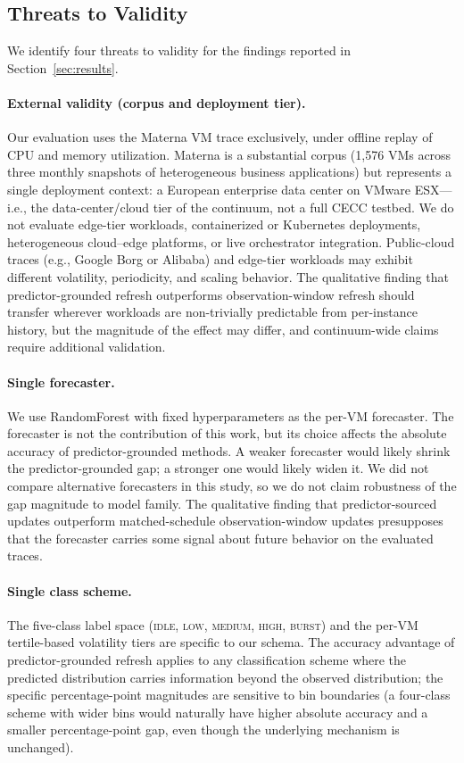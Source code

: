 \documentclass[manuscript,screen,review,anonymous]{acmart}
\begin{document}
\subsection{Threats to Validity}\label{sec:discussion-threats}

We identify four threats to validity for the findings reported
in Section~\ref{sec:results}.

\paragraph{External validity (corpus and deployment tier).}
Our evaluation uses the Materna VM trace exclusively, under
offline replay of CPU and memory utilization. Materna is a
substantial corpus (1{,}576 VMs across three monthly snapshots of
heterogeneous business applications) but represents a single
deployment context: a European enterprise data center on VMware
ESX---i.e., the data-center/cloud tier of the continuum, not a
full CECC testbed. We do not evaluate edge-tier workloads,
containerized or Kubernetes deployments, heterogeneous
cloud--edge platforms, or live orchestrator integration.
Public-cloud traces (e.g., Google Borg or Alibaba) and edge-tier
workloads may exhibit different volatility, periodicity, and
scaling behavior. The qualitative finding that predictor-grounded
refresh outperforms observation-window refresh should transfer
wherever workloads are non-trivially predictable from
per-instance history, but the magnitude of the effect may differ,
and continuum-wide claims require additional validation.

\paragraph{Single forecaster.} We use RandomForest with fixed
hyperparameters as the per-VM forecaster. The forecaster is not
the contribution of this work, but its choice affects the
absolute accuracy of predictor-grounded methods. A weaker
forecaster would likely shrink the predictor-grounded gap; a
stronger one would likely widen it. We did not compare alternative
forecasters in this study, so we do not claim robustness of the
gap magnitude to model family. The qualitative finding that
predictor-sourced updates outperform matched-schedule
observation-window updates presupposes that the forecaster
carries some signal about future behavior on the evaluated
traces.

\paragraph{Single class scheme.} The five-class label space
(\textsc{idle}, \textsc{low}, \textsc{medium}, \textsc{high},
\textsc{burst}) and the per-VM tertile-based volatility tiers
are specific to our schema. The accuracy advantage of
predictor-grounded refresh applies to any classification scheme
where the predicted distribution carries information beyond the
observed distribution; the specific percentage-point magnitudes
are sensitive to bin boundaries (a four-class scheme with wider
bins would naturally have higher absolute accuracy and a smaller
percentage-point gap, even though the underlying mechanism is
unchanged).
\end{document}
